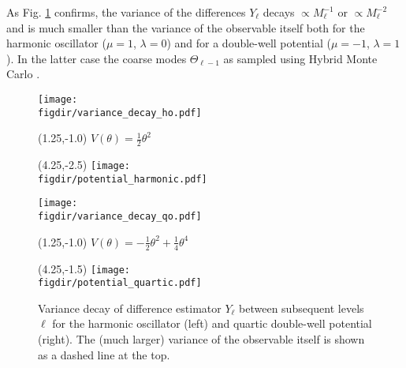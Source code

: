 \documentclass[11pt]{article}
\newcommand{\figdir}{./figures/}
\begin{document}
As Fig. \ref{fig:quantum_results} confirms, the variance of the differences $Y_\ell$ decays $\propto M_\ell^{-1}$ or $\propto M_\ell^{-2}$ and is much smaller than the variance of the observable itself both for the harmonic oscillator ($\mu=1$, $\lambda=0$) and for a double-well potential ($\mu=-1$, $\lambda=1$). In the latter case the coarse modes $\Theta_{\ell-1}$ as sampled using Hybrid Monte Carlo \cite{Duane1987}.
\begin{figure}
  \begin{center}
  \begin{minipage}{0.45\linewidth}
    \texttt{[image: \\figdir/variance\_decay\_ho.pdf]}
    \begin{textblock}{4.0}(1.25,-1.0)
      $V(\theta)=\frac{1}{2}\theta^2$
    \end{textblock}
    \begin{textblock}{4.0}(4.25,-2.5)
      \texttt{[image: \\figdir/potential\_harmonic.pdf]}
    \end{textblock}
  \end{minipage}
  \hfill
  \begin{minipage}{0.45\linewidth}
    \texttt{[image: \\figdir/variance\_decay\_qo.pdf]}
    \begin{textblock}{4.0}(1.25,-1.0)
      $V(\theta)=-\frac{1}{2}\theta^2+\frac{1}{4}\theta^4$
    \end{textblock}
    \begin{textblock}{4.0}(4.25,-1.5)
      \texttt{[image: \\figdir/potential\_quartic.pdf]}
    \end{textblock}
  \end{minipage}
  \caption{Variance decay of difference estimator $Y_\ell$ between subsequent levels $\ell$ for the harmonic oscillator (left) and quartic double-well potential (right). The (much larger) variance of the observable itself is shown as a dashed line at the top.}
  \label{fig:quantum_results}
  \end{center}
\end{figure}
\end{document}
